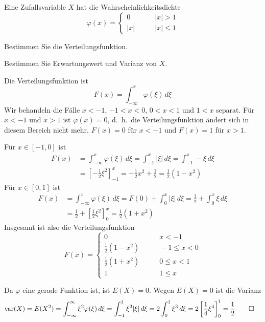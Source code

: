Eine Zufallsvariable $X$ hat die Wahrscheinlichkeitsdichte
\[
\varphi(x)=\begin{cases}
0&\qquad |x|>1\\
|x|&\qquad |x|\le 1
\end{cases}
\]
\begin{teilaufgaben}
\item Bestimmen Sie die Verteilungsfunktion.
\item Bestimmen Sie Erwartungswert und Varianz von $X$.
\end{teilaufgaben}

\begin{loesung}
\begin{teilaufgaben}
\item Die Verteilungsfunktion ist
\[
F(x)=\int_{-\infty}^x\varphi(\xi)\,d\xi
\]
Wir behandeln die Fälle $x<-1$, $-1<x<0$, $0<x<1$ und $1<x$
separat. Für $x<-1$ und $x>1$ ist $\varphi(x)=0$, d.~h.~die
Verteilungsfunktion ändert sich in diesem Bereich nicht mehr,
$F(x)=0$ für $x<-1$ und $F(x)=1$ für $x>1$.

Für $x\in[-1,0]$ ist
\begin{align*}
F(x)&=\int_{-\infty}^x\varphi(\xi) \,d\xi
=
\int_{-1}^x|\xi|\,d\xi
=
\int_{-1}^x-\xi\,d\xi
\\
&=\left[-\frac12\xi^2\right]_{-1}^x
=-\frac12x^2+\frac12=\frac12(1-x^2)
\end{align*}
Für $x\in[0,1]$ ist
\begin{align*}
F(x)
&=
\int_{-\infty}^x \varphi(\xi)\,d\xi
=
F(0)+\int_0^x|\xi|\,d\xi
=
\frac12+\int_0^x\xi\,d\xi
\\
&=
\frac12+\left[
\frac12\xi^2
\right]_0^x
=\frac12(1+x^2)
\end{align*}
Insgesamt ist also die Verteilungsfunktion
\[
F(x)
=
\begin{cases}
0&\qquad x<-1\\
\frac12(1-x^2)&\qquad -1\le x < 0\\
\frac12(1+x^2)&\qquad 0\le x <1\\
1&\qquad 1 \le x
\end{cases}
\]
\item
Da $\varphi$ eine gerade Funktion ist, ist $E(X)=0$.
Wegen $E(X)=0$ ist die Varianz
\begin{align*}
\operatorname{var}(X)&=E(X^2)
=
\int_{-\infty}^\infty \xi^2\varphi(\xi)\,d\xi
=
\int_{-1}^1\xi^2|\xi|\,d\xi
=2\int_0^1\xi^3\,d\xi=2\left[\frac14\xi^4\right]_0^1=\frac12
\qedhere
\end{align*}
\end{teilaufgaben}
\end{loesung}

